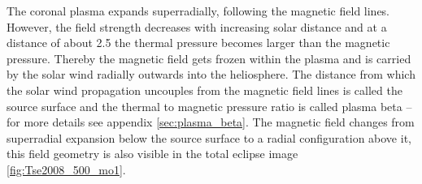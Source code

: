 The coronal plasma expands superradially, following the magnetic field lines. However, the field strength decreases with increasing solar distance and at a distance of about \SI{2.5}{\Rs} the thermal pressure becomes larger than the magnetic pressure. Thereby the magnetic field gets frozen within the plasma and is carried by the solar wind radially outwards into the heliosphere. The distance from which the solar wind propagation uncouples from the magnetic field lines is called the source surface \citep{Schatten1969} and the thermal to magnetic pressure ratio is called plasma beta -- for more details see appendix \autoref{sec:plasma_beta}. The magnetic field changes from superradial expansion below the source surface to a radial configuration above it, this field geometry is also visible in the total eclipse image \autoref{fig:Tse2008_500_mo1}.

